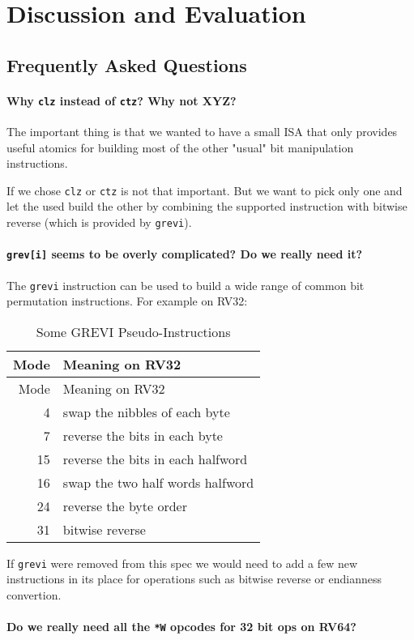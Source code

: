 \chapter{Discussion and Evaluation}

\section{Frequently Asked Questions}

\subsubsection{Why \texttt{clz} instead of \texttt{ctz}? Why not XYZ?}

The important thing is that we wanted to have a small ISA that only provides
useful atomics for building most of the other "usual" bit manipulation
instructions.

If we chose \texttt{clz} or \texttt{ctz} is not that important. But we want to
pick only one and let the used build the other by combining the supported
instruction with bitwise reverse (which is provided by \texttt{grevi}).

\subsubsection{\texttt{grev[i]} seems to be overly complicated? Do we really need it?}

The \texttt{grevi} instruction can be used to build a wide range of common
bit permutation instructions. For example on RV32:

\begin{longtable}[c]{@{}rl@{}}
\caption{Some GREVI Pseudo-Instructions}\tabularnewline
\toprule
Mode & Meaning on RV32\tabularnewline
\midrule
\endfirsthead
\toprule
Mode & Meaning on RV32\tabularnewline
\midrule
\endhead
4 & swap the nibbles of each byte\tabularnewline
7 & reverse the bits in each byte\tabularnewline
15 & reverse the bits in each halfword\tabularnewline
16 & swap the two half words halfword\tabularnewline
24 & reverse the byte order\tabularnewline
31 & bitwise reverse\tabularnewline
\bottomrule
\end{longtable}

If \texttt{grevi} were removed from this spec we would need to add a few new
instructions in its place for operations such as bitwise reverse or
endianness convertion.

\subsubsection{Do we really need all the \texttt{*W} opcodes for 32 bit ops on RV64?}

